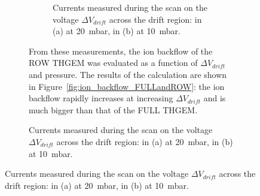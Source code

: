 \documentclass[a4paper, 11 pt]{article}
\newcommand{\Vdrift}{$ \Delta V_{drift}$}
\begin{document}
\begin{figure}[htbp]
\begin{figure}[htbp]
\begin{figure}[!htb]
	\centering
	\caption{Currents measured during the scan on the voltage \Vdrift{} across the drift region: in (a) at 20~mbar, in (b) at 10~mbar.}
	\label{fig:drift_ROWTHGEM_20and10_mbar}
\end{figure}



From these measurements, the ion backflow of the ROW THGEM was evaluated as a function of \Vdrift{} and pressure.
The results of the calculation are shown in Figure~\ref{fig:ion_backflow_FULLandROW}: the ion backflow rapidly increases at increasing \Vdrift{} and is much bigger than that of the FULL THGEM.






\end{figure}
\end{figure}
\end{document}

